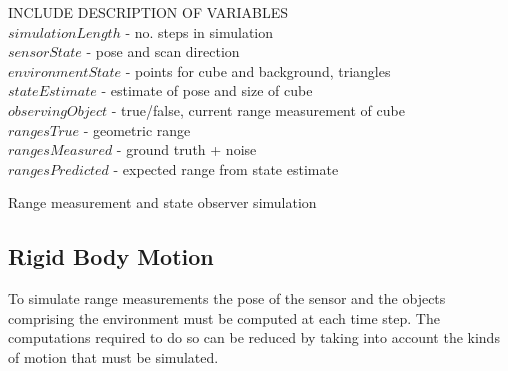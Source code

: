 \IncMargin{2em}	
	\begin{algorithm}
	\DontPrintSemicolon
	INCLUDE DESCRIPTION OF VARIABLES\\
	$simulationLength$ - no. steps in simulation\\
	$sensorState$ - pose and scan direction\\
	$environmentState$ - points for cube and background, triangles\\
	$stateEstimate$ - estimate of pose and size of cube\\
	$observingObject$ - true/false, current range measurement of cube\\
	$rangesTrue$ - geometric range\\
	$rangesMeasured$ - ground truth + noise\\
	$rangesPredicted$ - expected range from state estimate\\
	\caption{Range measurement and state observer simulation} \label{main}
	\end{algorithm}

\subsection{Rigid Body Motion}
To simulate range measurements the pose of the sensor and the objects comprising the environment must be computed at each time step. The computations required to do so can be reduced by taking into account the kinds of motion that must be simulated.

